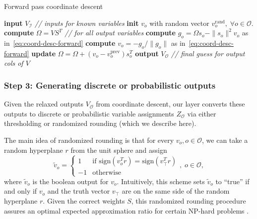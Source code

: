 \documentclass{article}
\newcommand{\outdex}{o}
\newcommand{\truthvar}{\top}
\newcommand{\inset}{\mathcal{I}}
\newcommand{\outset}{\mathcal{O}}
\begin{document}
	\begin{algorithm}[t]
		\begin{algorithmic}[1]
			\caption{Forward pass coordinate descent}
			\State \textbf{input} $V_{\inset}$ \hspace{3.5em} \emph{// inputs for known variables}
			\State \textbf{init} $v_{\outdex}$ with random vector $v^{\text{rand}}_{\outdex},\;\forall \outdex \in \outset$.
			\State \textbf{compute} $\Omega = VS^T$
			\For{$\outdex \in \outset$} \hspace{1em} \emph{// for all output variables}
			\State \textbf{compute} $g_{\outdex} = \Omega s_{\outdex} - \|s_{\outdex}\|^2 v_{\outdex}$ as in~\eqref{eq:coord-desc-forward}
			\State \textbf{compute} $v_{\outdex} = -g_{\outdex}/\|g_{\outdex}\|$ as in~\eqref{eq:coord-desc-forward}
\State \textbf{update} $\Omega = \Omega + (v_{\outdex} - v_{\outdex}^{\text{prev}})s_{\outdex}^T$
			\EndFor
			\EndWhile
			\State \textbf{output} $V_{\outset}$ \hspace{3.5em} \emph{// final guess for output cols of $V$}
			\label{alg:forward-pass-cd}
		\end{algorithmic}
	\end{algorithm}
	
	\subsubsection{Step 3: Generating discrete or probabilistic outputs}
	\label{sec:rr}
	
	Given the relaxed outputs 
$V_{\outset}$
	from coordinate descent, our layer converts these outputs to discrete or probabilistic variable assignments 
$Z_{\outset}$
	via either thresholding or randomized rounding (which we describe here). 
	
	The main idea of randomized rounding is that for every $v_{\outdex}, \outdex \in \outset$, we can take a random hyperplane $r$ from the unit sphere and assign
	\begin{equation}
		\tilde{v}_{\outdex} = \begin{cases}
			1& \text{if }\text{sign}(v_{\outdex}^Tr) = \text{sign}(v_{\truthvar}^T r)\\
			-1&\text{otherwise}
		\end{cases}, \; \outdex \in \outset,
	\end{equation}
	where $\tilde{v}_{\outdex}$ is the boolean output for $v_{\outdex}$. 
	Intuitively, this scheme sets $\tilde{v}_{\outdex}$ to ``true'' if and only if $v_{\outdex}$ and the truth vector $v_{\truthvar}$ are on the same side of the random hyperplane $r$.
	Given the correct weights $S$, this randomized rounding procedure assures an optimal expected approximation ratio for certain NP-hard problems \cite{goemans1995improved}. 
	
\end{document}
